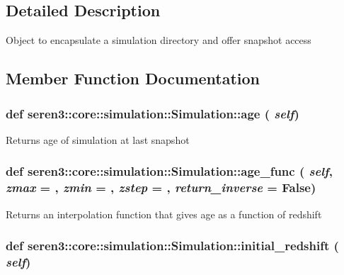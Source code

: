 \subsection{Detailed Description}
\begin{DoxyVerb}
Object to encapsulate a simulation directory and offer snapshot access
\end{DoxyVerb}
 

\subsection{Member Function Documentation}
\hypertarget{classseren3_1_1core_1_1simulation_1_1Simulation_a9370d2c72a3bfe89c09ba1491b576a17}{
\subsubsection[{age}]{\setlength{\rightskip}{0pt plus 5cm}def seren3::core::simulation::Simulation::age ( {\em self})}}
\label{classseren3_1_1core_1_1simulation_1_1Simulation_a9370d2c72a3bfe89c09ba1491b576a17}
\begin{DoxyVerb}
Returns age of simulation at last snapshot
\end{DoxyVerb}
 \hypertarget{classseren3_1_1core_1_1simulation_1_1Simulation_a432584684833880fa6fc60f417eaa7bc}{
\subsubsection[{age\_\-func}]{\setlength{\rightskip}{0pt plus 5cm}def seren3::core::simulation::Simulation::age\_\-func ( {\em self}, \/   {\em zmax} = {}, \/   {\em zmin} = {}, \/   {\em zstep} = {}, \/   {\em return\_\-inverse} = {\ttfamily False})}}
\label{classseren3_1_1core_1_1simulation_1_1Simulation_a432584684833880fa6fc60f417eaa7bc}
\begin{DoxyVerb}
Returns an interpolation function that gives age as a function
of redshift
\end{DoxyVerb}
 \hypertarget{classseren3_1_1core_1_1simulation_1_1Simulation_addf704f464ffb0289cd5bce16d91da5d}{
\subsubsection[{initial\_\-redshift}]{\setlength{\rightskip}{0pt plus 5cm}def seren3::core::simulation::Simulation::initial\_\-redshift ( {\em self})}}
